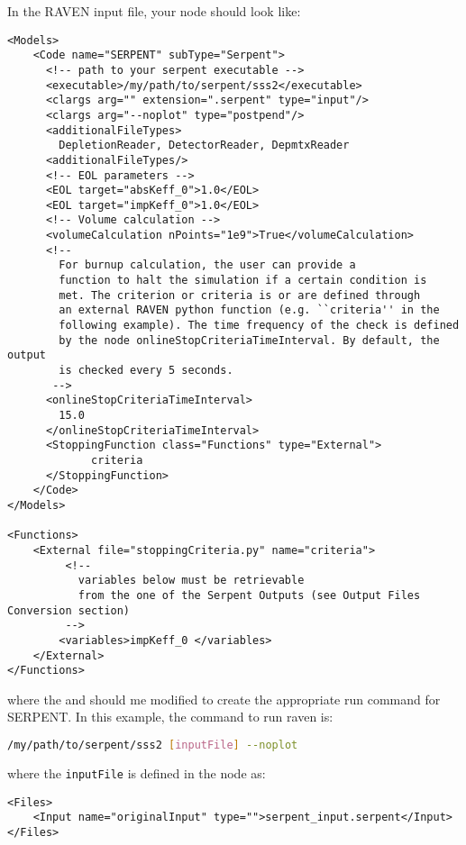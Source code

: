 In the RAVEN input file, your  node should look like:
\begin{lstlisting}[style=XML]
<Models>
    <Code name="SERPENT" subType="Serpent">
      <!-- path to your serpent executable -->
      <executable>/my/path/to/serpent/sss2</executable>
      <clargs arg="" extension=".serpent" type="input"/>
      <clargs arg="--noplot" type="postpend"/>
      <additionalFileTypes>
        DepletionReader, DetectorReader, DepmtxReader
      <additionalFileTypes/>
      <!-- EOL parameters -->
      <EOL target="absKeff_0">1.0</EOL>
      <EOL target="impKeff_0">1.0</EOL>
      <!-- Volume calculation -->
      <volumeCalculation nPoints="1e9">True</volumeCalculation>
      <!--
        For burnup calculation, the user can provide a
        function to halt the simulation if a certain condition is
        met. The criterion or criteria is or are defined through
        an external RAVEN python function (e.g. ``criteria'' in the
        following example). The time frequency of the check is defined
        by the node onlineStopCriteriaTimeInterval. By default, the output
        is checked every 5 seconds.
       -->
      <onlineStopCriteriaTimeInterval>
        15.0
      </onlineStopCriteriaTimeInterval>
      <StoppingFunction class="Functions" type="External">
             criteria
      </StoppingFunction>
    </Code>
</Models>

<Functions>
    <External file="stoppingCriteria.py" name="criteria">
         <!-- 
           variables below must be retrievable
           from the one of the Serpent Outputs (see Output Files Conversion section)
         -->
        <variables>impKeff_0 </variables>
    </External>
</Functions>
\end{lstlisting}
where the  and  should me modified
to create the appropriate run command for SERPENT. In this example, the command
to run raven is:
\begin{lstlisting}[language=bash]
/my/path/to/serpent/sss2 [inputFile] --noplot
\end{lstlisting}
where the \texttt{inputFile} is defined in the  node as:
\begin{lstlisting}[style=XML]
<Files>
    <Input name="originalInput" type="">serpent_input.serpent</Input>
</Files>
\end{lstlisting}

